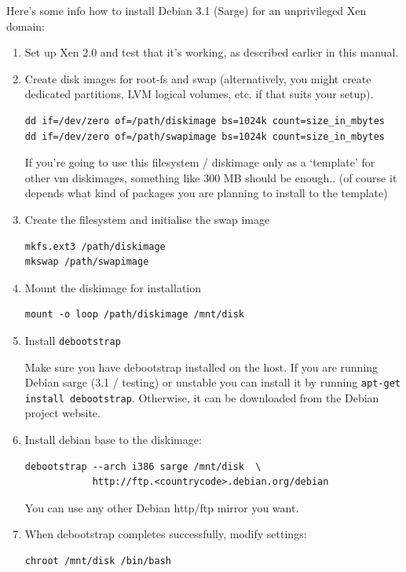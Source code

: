 \documentclass[11pt,twoside,final,openright]{xenstyle}
\begin{document}
{Here's some info how to install Debian 3.1 (Sarge) for an unprivileged
Xen domain:

\begin{enumerate}
\item Set up Xen 2.0 and test that it's working, as described earlier in
      this manual.

\item Create disk images for root-fs and swap (alternatively, you
      might create dedicated partitions, LVM logical volumes, etc. if
      that suits your setup).
\begin{verbatim}  
dd if=/dev/zero of=/path/diskimage bs=1024k count=size_in_mbytes
dd if=/dev/zero of=/path/swapimage bs=1024k count=size_in_mbytes
\end{verbatim}
      If you're going to use this filesystem / diskimage only as a
      `template' for other vm diskimages, something like 300 MB should
      be enough.. (of course it depends what kind of packages you are
      planning to install to the template)

\item Create the filesystem and initialise the swap image
\begin{verbatim}
mkfs.ext3 /path/diskimage
mkswap /path/swapimage
\end{verbatim}

\item Mount the diskimage for installation
\begin{verbatim}
mount -o loop /path/diskimage /mnt/disk
\end{verbatim}

\item Install {\tt debootstrap}

Make sure you have debootstrap installed on the host.  If you are
running Debian sarge (3.1 / testing) or unstable you can install it by
running {\tt apt-get install debootstrap}.  Otherwise, it can be
downloaded from the Debian project website.

\item Install debian base to the diskimage:
\begin{verbatim}
debootstrap --arch i386 sarge /mnt/disk  \
            http://ftp.<countrycode>.debian.org/debian
\end{verbatim}

You can use any other Debian http/ftp mirror you want.

\item When debootstrap completes successfully, modify settings:
\begin{verbatim}
chroot /mnt/disk /bin/bash
\end{verbatim}


\end{enumerate}}
\end{document}
